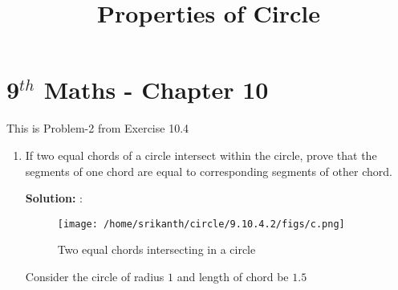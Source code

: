 \documentclass[10pt]{article}
\newcommand{\solution}{\noindent \textbf{Solution: }}
\begin{document}
\begin{center}
\title{\textbf{Properties of Circle}}
\date{\vspace{-5ex}} %
\maketitle
\end{center}
\setcounter{page}{1}
\section{9$^{th}$ Maths - Chapter 10}
       This is Problem-2 from Exercise 10.4
\begin{enumerate}
\item If two equal chords of a circle intersect within the circle, prove that the segments of one chord are equal to corresponding segments of other chord.

\solution:
\begin{figure}[h!]
	\begin{center} 
	  \texttt{[image: /home/srikanth/circle/9.10.4.2/figs/c.png]}
	\end{center}
\caption{Two equal chords intersecting in a circle}
\label{fig:Fig1}
\end{figure} 
Consider the circle of radius $1$ and length of chord be $1.5$
\begin{table}[h!]
	
\caption{}
\label{table}
\end{table}

\end{enumerate}
\end{document}
